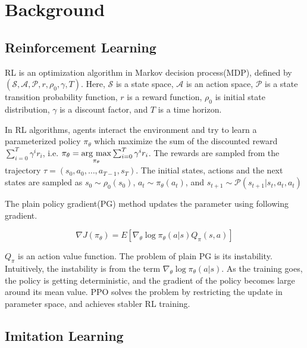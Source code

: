 \section{Background\label{background}}

\subsection{Reinforcement Learning}

RL is an optimization algorithm in Markov decision process(MDP), defined by $\left(\mathcal{S}, \mathcal{A}, \mathcal{P}, r, \rho_{0}, \gamma, T\right)$. Here, $\mathcal{S}$ is a state space, $\mathcal{A}$ is an action space, $\mathcal{P}$ is a state transition probability function, $r$ is a reward function, $\rho_{0}$ is initial state distribution, $\gamma$ is a discount factor, and $T$ is a time horizon.

In RL algorithms, agents interact the environment and try to learn a parameterized policy $\pi_\theta$ which maximize the sum of the discounted reward $\sum_{i=0}^{T} \gamma^{i} r_{i}$, i.e. $\pi_\theta = \mathop{\rm arg~max}\limits_{\pi_\theta} \sum_{i=0}^{T} \gamma^{i} r_{i}$. The rewards are sampled from the trajectory $\tau=\left(s_{0}, a_{0}, \ldots, a_{T-1}, s_{T}\right)$. The initial states, actions and the next states are sampled as $s_{0} \sim \rho_{0}\left(s_{0}\right)$, $a_{t} \sim \pi_{\theta}\left(a_{t}\right)$, and $s_{t+1} \sim \mathcal{P}\left(s_{t+1} | s_{t}, a_{t}, a_{t}\right)$

The plain policy gradient(PG) method updates the parameter using following gradient.

\begin{equation} \label{eq:PG}
\nabla J\left(\pi_{\theta}\right)=E\left[\nabla_{\theta} \log \pi_{\theta}(a | s) Q_{\pi}(s, a)\right]
\end{equation}

$Q_{\pi}$ is an action value function. The problem of plain PG is its instability. Intuitively, the instability is from the term $\nabla_{\theta} \log \pi_{\theta}(a | s)$. As the training goes, the policy is getting deterministic, and the gradient of the policy becomes large around its mean value. PPO solves the problem by restricting the update in parameter space, and achieves stabler RL training.

\subsection{Imitation Learning}

